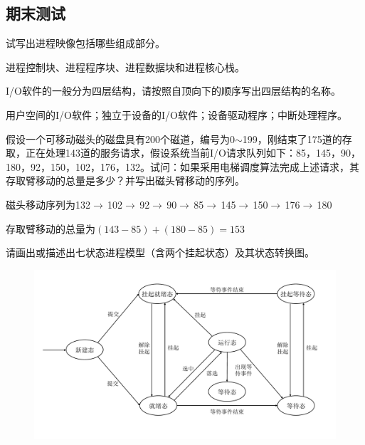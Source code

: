 \subsection*{期末测试}
\setcounter{problemname}{0}

\begin{problem}
试写出进程映像包括哪些组成部分。
\end{problem}

\begin{solution}
进程控制块、进程程序块、进程数据块和进程核心栈。
\end{solution}


\begin{problem}
I/O软件的一般分为四层结构，请按照自顶向下的顺序写出四层结构的名称。
\end{problem}
    
\begin{solution}
    用户空间的I/O软件；独立于设备的I/O软件；设备驱动程序；中断处理程序。
\end{solution}


\begin{problem}
假设一个可移动磁头的磁盘具有200个磁道，编号为0$\sim$199，刚结束了175道的存取，正在处理143道的服务请求，假设系统当前I/O请求队列如下：85，145，90，180，92，150，102，176，132。试问：如果采用电梯调度算法完成上述请求，其存取臂移动的总量是多少？并写出磁头臂移动的序列。
\end{problem}

\begin{solution}
    磁头移动序列为132$\rightarrow$\,102$\rightarrow$\,92$\rightarrow$\,90$\rightarrow$\,85$\rightarrow$\,145$\rightarrow$\,150$\rightarrow$\,176$\rightarrow$\,180

    存取臂移动的总量为$(143-85)+(180-85)=153$
\end{solution}


\begin{problem}
请画出或描述出七状态进程模型（含两个挂起状态）及其状态转换图。
\end{problem}

\begin{solution}
    \begin{figure}[H]
        \vspace{-0.5em}
        \centering
        \includegraphics[width=0.7\linewidth]{七状态进程模型.pdf}
        \vspace{-1em}
    \end{figure}
\end{solution}



